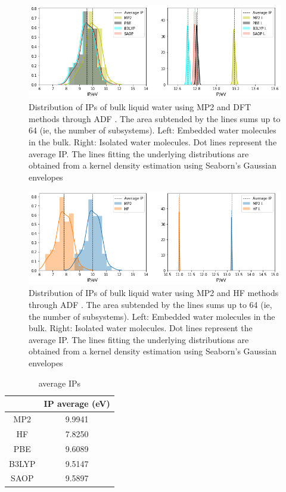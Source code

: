 \documentclass[12pt,a4paper]{article}
\begin{document}
\begin{figure}[!ht]
        \centering
        \includegraphics[width=\linewidth]{MP2-DFT}
	\caption{Distribution of IPs of bulk liquid water using MP2 and DFT methods through ADF \cite{te2001chemistry}. The area subtended by the lines sums up to 64 (ie, the number of subsystems). Left: Embedded water molecules in the bulk. Right: Isolated water molecules. Dot lines represent the average IP. The lines fitting the underlying distributions are obtained from a kernel density estimation using Seaborn's Gaussian envelopes\cite{waskom2017c}}
\end{figure}




\begin{figure}[!ht]
        \centering
        \includegraphics[width=\linewidth]{MP2-HF}
        \caption{Distribution of IPs of bulk liquid water using MP2 and HF methods through ADF \cite{te2001chemistry}. The area subtended by the lines sums up to 64 (ie, the number of subsystems). Left: Embedded water molecules in the bulk. Right: Isolated water molecules. Dot lines represent the average IP. The lines fitting the underlying distributions are obtained from a kernel density estimation using Seaborn's Gaussian envelopes\cite{waskom2017c}}
\end{figure}




\begin{table}[!ht]
 \begin{center}
  \caption{average IPs}
  \label{tab:table1}
  \begin{tabular}{ |c|c| }
	\hline\hline
	&IP average (eV)\\
	\hline
	MP2&9.9941\\
	\hline
	HF& 7.8250\\
	\hline
	PBE&9.6089\\
        \hline
        B3LYP&9.5147\\
        \hline
        SAOP&9.5897\\
	\hline
   \end{tabular}
 \end{center}
\end{table}
\end{document}
